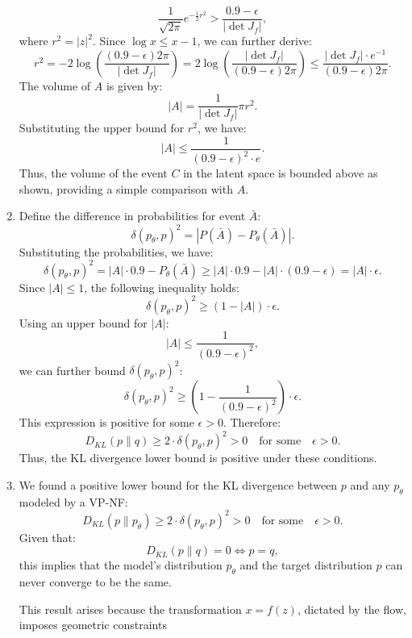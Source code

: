 \documentclass{article}
\begin{document}
\begin{enumerate}
    \[
    \frac{1}{\sqrt{2\pi}} e^{-\frac{1}{2} r^2} > \frac{0.9 - \epsilon}{|\det J_f|},
    \]
    where \( r^2 = |z|^2 \). Since \(\log x \leq x - 1\), we can further derive:
    \[
    r^2 = -2 \log \left(\frac{(0.9 - \epsilon) 2\pi}{|\det J_f|}\right)
    = 2 \log \left(\frac{|\det J_f|}{(0.9 - \epsilon) 2\pi}\right)
    \leq \frac{|\det J_f| \cdot e^{-1}}{(0.9 - \epsilon) 2\pi }.
    \]
    The volume of \(A\) is given by:
    \[
    |A| = \frac{1}{|\det J_f|} \pi r^2.
    \]
    Substituting the upper bound for \(r^2\), we have:
    \[
    |A| \leq \frac{1}{(0.9 - \epsilon)^2 \cdot e}.
    \]
    Thus, the volume of the event \(C\) in the latent space is bounded above as shown, providing a simple comparison with \(A\).
    \item 
    Define the difference in probabilities for event \(\bar{A}\):
    \[
    \delta(p_{\theta}, p)^2 = |P(\bar{A}) - P_{\theta}(\bar{A})|.
    \]    
    Substituting the probabilities, we have:
    \[
    \delta(p_{\theta}, p)^2 = |A| \cdot 0.9 - P_{\theta}(\bar{A}) 
    \geq |A| \cdot 0.9 - |A| \cdot (0.9 - \epsilon) = |A| \cdot \epsilon.
    \]
    Since \(|A| \leq 1\), the following inequality holds:
    \[
    \delta(p_{\theta}, p)^2 \geq (1 - |A|) \cdot \epsilon.
    \]
    Using an upper bound for \(|A|\):
    \[
    |A| \leq \frac{1}{(0.9 - \epsilon)^2},
    \]
    we can further bound \(\delta(p_{\theta}, p)^2\):
    \[
    \delta(p_{\theta}, p)^2 \geq \left( 1 - \frac{1}{(0.9 - \epsilon)^2} \right) \cdot \epsilon.
    \]
    This expression is positive for some \(\epsilon > 0\). Therefore:
    \[
    D_{KL}(p \parallel q) \geq 2 \cdot \delta(p_{\theta}, p)^2 > 0 \quad \text{for some} \quad \epsilon > 0.
    \]
    Thus, the KL divergence lower bound is positive under these conditions.
    \item 

    We found a positive lower bound for the KL divergence between \(p\) and any \(p_\theta\) modeled by a VP-NF:
    \[
    D_{KL}(p \parallel p_\theta) \geq 2 \cdot \delta(p_\theta, p)^2 > 0 \quad \text{for some} \quad \epsilon > 0.
    \]
    Given that:
    \[
    D_{KL}(p \parallel q) = 0 \iff p = q,
    \]
    this implies that the model’s distribution \(p_\theta\) and the target distribution \(p\) can never converge to be the same.
    
    This result arises because the transformation \(x = f(z)\), dictated by the flow, imposes geometric constraints

\end{enumerate}
\end{document}
